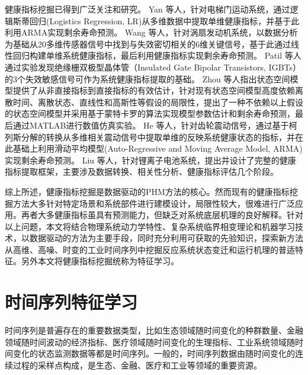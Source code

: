 健康指标挖掘已得到广泛关注和研究。
Yan 等人，针对电梯门运动系统，通过逻辑斯蒂回归(Logistics Regression, LR)从多维数据中提取单维健康指标，并基于此利用ARMA实现剩余寿命预测\cite{yan2004prognostic}。
Wang 等人，针对涡扇发动机系统，以数据分析为基础从20多维传感器信号中找到与失效密切相关的6维关键信号，基于此通过线性回归构建单维系统健康指标，最后利用健康指标实现剩余寿命预测\cite{wang2008similarity}。
Patil 等人通过实验发现绝缘栅双极型晶体管（Insulated Gate Bipolar Transistors, IGBTs）的3个失效敏感信号可作为系统健康指标提取的基础\cite{patil2008failure}。
Zhou 等人指出状态空间模型提供了从非直接指标到直接指标的有效估计，针对现有状态空间模型高度依赖离散时间、离散状态、直线性和高斯性等假设的局限性，提出了一种不依赖以上假设的状态空间模型并采用基于蒙特卡罗的算法实现模型参数估计和剩余寿命预测，最后通过MATLAB进行数值仿真实验\cite{zhou2011latent}。
He 等人，针对齿轮震动信号，通过基于柯列斯分解的转换从多维相关震动信号中提取单维的反映系统健康状态的指标，并在此基础上利用滑动平均模型(Auto-Regressive and Moving Average Model, ARMA)实现剩余寿命预测\cite{he2012integrated}。
Liu 等人，针对锂离子电池系统，提出并设计了完整的健康指标提取框架，主要涉及数据转换、相关性分析、健康指标评估几个阶段\cite{liu2015health}。 

综上所述，健康指标挖掘是数据驱动的PHM方法的核心。然而现有的健康指标挖掘方法大多针对特定场景和系统部件进行建模设计，局限性较大，很难进行广泛应用。再者大多健康指标虽具有预测能力，但缺乏对系统底层机理的良好解释。针对以上问题，本文将结合物理系统动力学特性、复杂系统临界相变理论和机器学习技术，以数据驱动的方法为主要手段，同时充分利用可获取的先验知识，探索新方法从高维、高噪、时变的工业时间序列中挖掘反应系统状态变迁和运行机理的普适特征。另外本文将健康指标挖掘统称为{\heiti 特征学习}。

\section{时间序列特征学习}
\label{sec:ts-representation-review}

时间序列是普遍存在的重要数据类型，比如生态领域随时间变化的种群数量、金融领域随时间波动的经济指标、医疗领域随时间变化的生理指标、工业系统领域随时间变化的状态监测数据等都是时间序列\cite{aggarwal2015data}。一般的，时间序列数据由随时间变化的连续过程的采样点构成，是生态、金融、医疗和工业等领域的重要资源\cite{esling2012time,gaber2005mining}。

